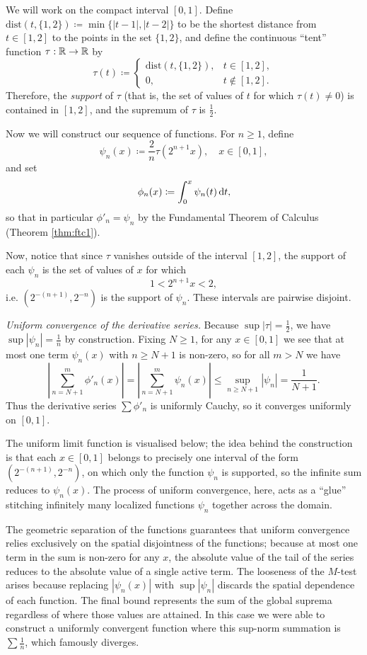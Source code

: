 \documentclass[../analysis1.tex]{subfiles}
\begin{document}
\begin{example}
    We will work on the compact interval $[0,1]$. Define $\allowbreak \mathrm{dist}(t,\{1,2\})\coloneqq \min \{|t-1|,|t-2|\}$ to be the shortest distance from $t\in[1,2]$ to the points in the set $\{1,2\}$, and define the continuous ``tent'' function $\tau:\mathbb{R}\to\mathbb{R}$ by \[\tau(t)\coloneqq \begin{cases}
        \mathrm{dist}(t,\{1,2\}),& t\in[1,2],\\
        0,& t\notin [1,2].
    \end{cases}\]
    Therefore, the \textit{support} of $\tau$ (that is, the set of values of $t$ for which $\tau(t)\ne 0$) is contained in $[1,2]$, and the supremum of $\tau$ is $\frac{1}{2}$.

    Now we will construct our sequence of functions. For $n\ge 1$, define \[\psi_n(x)\coloneqq \frac{2}{n}\tau(2^{n+1}x),\quad x\in[0,1],\]
    and set \[\phi_n(x)\coloneqq \int_0^x \psi_n(t)\d{t},\]
    so that in particular $\phi'_n=\psi_n$ by the Fundamental Theorem of Calculus (Theorem \ref{thm:ftc1}).

    Now, notice that since $\tau$ vanishes outside of the interval $[1,2]$, the support of each $\psi_n$ is the set of values of $x$ for which \[1<2^{n+1}x<2,\]
    i.e. $(2^{-(n+1)},2^{-n})$ is the support of $\psi_n$. These intervals are pairwise disjoint.

    \textit{Uniform convergence of the derivative series.} Because $\sup|\tau|= \frac{1}{2}$, we have $\sup|\psi_n|=\frac{1}{n}$ by construction. Fixing $N\ge 1$, for any $x\in[0,1]$ we see that at most one term $\psi_n(x)$ with $n\ge N+1$ is non-zero, so for all $m>N$ we have
    \[\left|\sum_{n=N+1}^m\phi'_n(x)\right|=\left|\sum_{n=N+1}^m\psi_n(x)\right|\le \sup_{n\ge N+1}|\psi_n|=\frac{1}{N+1}.\]
    Thus the derivative series $\sum \phi'_n$ is uniformly Cauchy, so it converges uniformly on $[0,1]$.
    
    The uniform limit function is visualised below; the idea behind the construction is that each $x\in[0,1]$ belongs to precisely one interval of the form $(2^{-(n+1)},2^{-n})$, on which only the function $\psi_n$ is supported, so the infinite sum reduces to $\psi_n(x)$. The process of uniform convergence, here, acts as a ``glue'' stitching infinitely many localized functions $\psi_n$ together across the domain. 

    The geometric separation of the functions guarantees that uniform convergence relies exclusively on the spatial disjointness of the functions; because at most one term in the sum is non-zero for any $x$, the absolute value of the tail of the series reduces to the absolute value of a single active term. The looseness of the $M$-test arises because replacing $|\psi_n(x)|$ with $\sup |\psi_n|$ discards the spatial dependence of each function. The final bound represents the sum of the global suprema regardless of where those values are attained. In this case we were able to construct a uniformly convergent function where this sup-norm summation is $\sum \frac{1}{n}$, which famously diverges.


\end{example}
\end{document}
